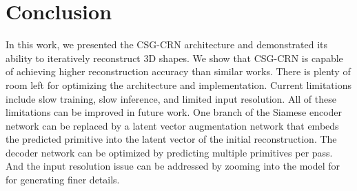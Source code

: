 
\chapter{Conclusion}
\label{chap:conclusion}

In this work, we presented the CSG-CRN architecture and demonstrated its ability to iteratively reconstruct 3D shapes. We show that CSG-CRN is capable of achieving higher reconstruction accuracy than similar works. There is plenty of room left for optimizing the architecture and implementation. Current limitations include slow training, slow inference, and limited input resolution. All of these limitations can be improved in future work. One branch of the Siamese encoder network can be replaced by a latent vector augmentation network that embeds the predicted primitive into the latent vector of the initial reconstruction. The decoder network can be optimized by predicting multiple primitives per pass. And the input resolution issue can be addressed by zooming into the model for for generating finer details.